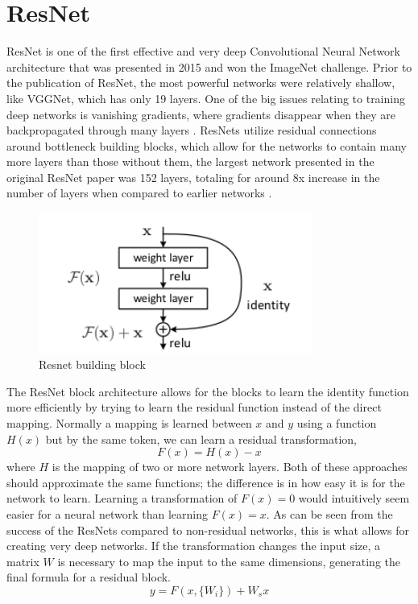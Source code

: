 \section{ResNet}
ResNet is one of the first effective and very deep Convolutional Neural Network architecture that was presented in 2015 and won the ImageNet challenge. Prior to the publication of ResNet, the most powerful networks were relatively shallow, like VGGNet, which has only 19 layers. One of the big issues relating to training deep networks is vanishing gradients, where gradients disappear when they are backpropagated through many layers \citep{wideResNet}. ResNets utilize residual connections around bottleneck building blocks, which allow for the networks to contain many more layers than those without them, the largest network presented in the original ResNet paper was 152 layers, totaling for around 8x increase in the number of layers when compared to earlier networks \citep{resNet}.

\begin{figure}[h!]
    \centering
    \includegraphics[width=0.8\textwidth]{imgs/resnet-block.png}
    \caption{Resnet building block \citep{resNet}}
\end{figure}

The ResNet block architecture allows for the blocks to learn the identity function more efficiently by trying to learn the residual function instead of the direct mapping. Normally a mapping is learned between ${x}$ and ${y}$ using a function ${H(x)}$ but by the same token, we can learn a residual transformation, \[{F(x) = H(x) - x}\] \noindent where ${H}$ is the mapping of two or more network layers. Both of these approaches should approximate the same functions; the difference is in how easy it is for the network to learn. Learning a transformation of ${F(x) = 0}$ would intuitively seem easier for a neural network than learning ${F(x) = x}$. As can be seen from the success of the ResNets compared to non-residual networks, this is what allows for creating very deep networks. If the transformation changes the input size, a matrix ${W}$ is necessary to map the input to the same dimensions, generating the final formula for a residual block. \[y = F(x, \{W_i\}) + W_s x\]

